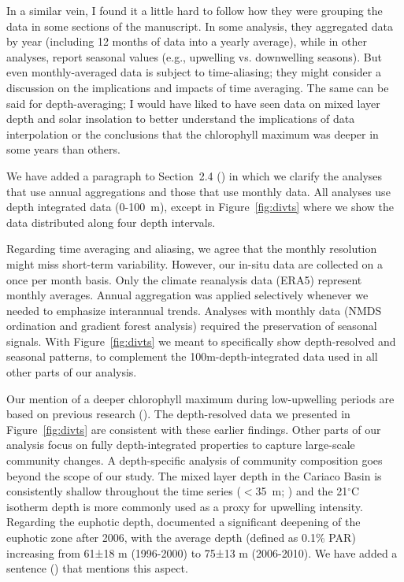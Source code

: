 \documentclass[12pt,english]{reviewresponse}
\begin{document}
\begin{revcomment} \label{comment:ChlMax}
	In a similar vein, I found it a little hard to follow how they were grouping the data in some sections of the manuscript. In some analysis, they aggregated data by year (including 12 months of data into a yearly average), while in other analyses, report seasonal values (e.g., upwelling vs. downwelling seasons). But even monthly-averaged data is subject to time-aliasing; they might consider a discussion on the implications and impacts of time averaging. The same can be said for depth-averaging; I would have liked to have seen data on mixed layer depth and solar insolation to better understand the implications of data interpolation or the conclusions that the chlorophyll maximum was deeper in some years than others.
\end{revcomment}

\begin{revresponse}
    We have added a paragraph to Section~2.4 () in which we clarify the analyses that use annual aggregations and those that use monthly data. All analyses use depth integrated data (0-100~m), except in Figure~\ref{fig:divts} where we show the data distributed along four depth intervals.
    
    Regarding time averaging and aliasing, we agree that the monthly resolution might miss short-term variability. However, our in-situ data are collected on a once per month basis. Only the climate reanalysis data (ERA5) represent monthly averages. Annual aggregation was applied selectively whenever we needed to emphasize interannual trends. Analyses with monthly data (NMDS ordination and gradient forest analysis) required the preservation of seasonal signals. With Figure~\ref{fig:divts} we meant to specifically show depth-resolved and seasonal patterns, to complement the 100m-depth-integrated data used in all other parts of our analysis.

    Our mention of a deeper chlorophyll maximum during low-upwelling periods are based on previous research (\cite{lorenzoni_characterization_2015, pinckney_phytoplankton_2015}). The depth-resolved data we presented in Figure~\ref{fig:divts} are consistent with these earlier findings. Other parts of our analysis focus on fully depth-integrated properties to capture large-scale community changes. A depth-specific analysis of community composition goes beyond the scope of our study. The mixed layer depth in the Cariaco Basin is consistently shallow throughout the time series ($<$35~m; \cite{muller-karger_scientific_2019}) and the 21$^{\circ}$C isotherm depth is more commonly used as a proxy for upwelling intensity. Regarding the euphotic depth, \cite{pinckney_phytoplankton_2015} documented a significant deepening of the euphotic zone after 2006, with the average depth (defined as 0.1\% PAR) increasing from 61±18 m (1996-2000) to 75±13 m (2006-2010). We have added a sentence () that mentions this aspect. 
\end{revresponse}
\end{document}
